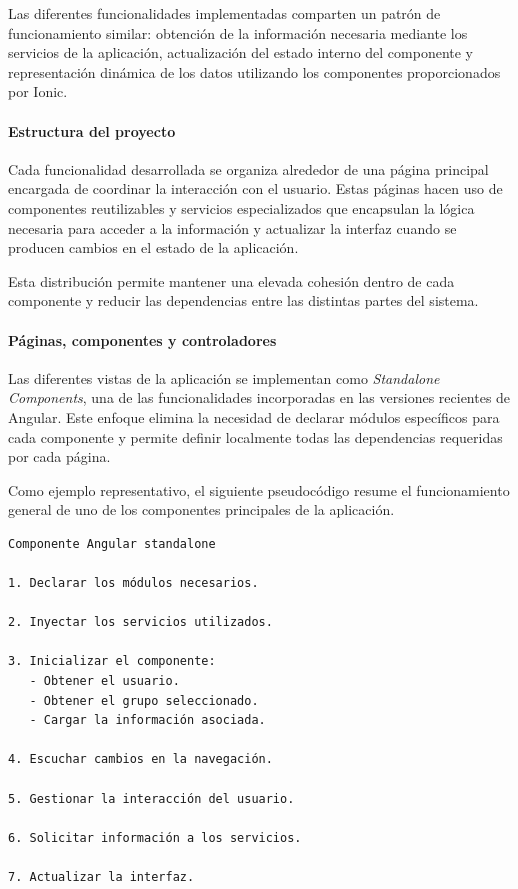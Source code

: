 Las diferentes funcionalidades implementadas comparten un patrón de funcionamiento similar: obtención de la información necesaria mediante los servicios de la aplicación, actualización del estado interno del componente y representación dinámica de los datos utilizando los componentes proporcionados por Ionic.

\paragraph{Estructura del proyecto}

Cada funcionalidad desarrollada se organiza alrededor de una página principal encargada de coordinar la interacción con el usuario. Estas páginas hacen uso de componentes reutilizables y servicios especializados que encapsulan la lógica necesaria para acceder a la información y actualizar la interfaz cuando se producen cambios en el estado de la aplicación.

Esta distribución permite mantener una elevada cohesión dentro de cada componente y reducir las dependencias entre las distintas partes del sistema.

\paragraph{Páginas, componentes y controladores}

Las diferentes vistas de la aplicación se implementan como \textit{Standalone Components}, una de las funcionalidades incorporadas en las versiones recientes de Angular. Este enfoque elimina la necesidad de declarar módulos específicos para cada componente y permite definir localmente todas las dependencias requeridas por cada página.

Como ejemplo representativo, el siguiente pseudocódigo resume el funcionamiento general de uno de los componentes principales de la aplicación.

\begin{Verbatim}[frame=single, fontsize=\small]
Componente Angular standalone

1. Declarar los módulos necesarios.

2. Inyectar los servicios utilizados.

3. Inicializar el componente:
   - Obtener el usuario.
   - Obtener el grupo seleccionado.
   - Cargar la información asociada.

4. Escuchar cambios en la navegación.

5. Gestionar la interacción del usuario.

6. Solicitar información a los servicios.

7. Actualizar la interfaz.
\end{Verbatim}

